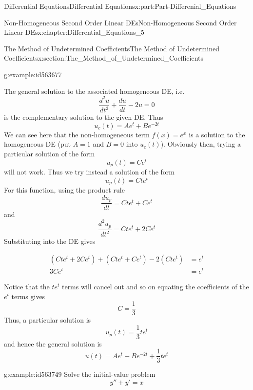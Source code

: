 \documentclass[oneside,10pt,]{book}
\numberwithin{equation}{section}
\newcommand{\amp}{&}
\begin{document}
\begin{partptx}{Differential Equations}{}{Differential Equations}{}{}{x:part:Part-Differenial_Equations}
\begin{chapterptx}{Non-Homogeneous Second Order Linear DEs}{}{Non-Homogeneous Second Order Linear DEs}{}{}{x:chapter:Differential_Equations_5}
\begin{sectionptx}{The Method of Undetermined Coefficients}{}{The Method of Undetermined Coefficients}{}{}{x:section:The_Method_of_Undetermined_Coefficients}
\begin{example}{}{g:example:id563677}
%
\par\smallskip%
\noindent\hypertarget{g:solution:id563725}{}The general solution to the associated homogeneous DE, i.e.%
\begin{equation*}
\frac{d^2u}{dt^2}+\frac{du}{dt}-2u=0
\end{equation*}
is the complementary solution to the given DE. Thus%
\begin{equation*}
u_c(t)=Ae^t+Be^{-2t}
\end{equation*}
We can see here that the non-homogeneous term \(f(x)=e^x\) is a solution to the homogeneous DE (put \(A=1\) and \(B=0\) into \(u_c(t)\)). Obviously then, trying a particular solution of the form%
\begin{equation*}
u_p(t)=Ce^t
\end{equation*}
will not work. Thus we try instead a solution of the form%
\begin{equation*}
u_p(t)=Cte^t
\end{equation*}
For this function, using the product rule%
\begin{equation*}
\frac{du_p}{dt}=Cte^t+Ce^t
\end{equation*}
and%
\begin{equation*}
\frac{d^2u_p}{dt^2}=Cte^t+2Ce^t
\end{equation*}
Substituting into the DE gives%
\par
%
\begin{align*}
(Cte^t+2Ce^t)+(Cte^t+Ce^t)-2(Cte^t) \amp =e^t\\
3Ce^t \amp =e^t
\end{align*}
%
\par
Notice that the \(te^t\) terms will cancel out and so on equating the coefficients of the \(e^t\) terms gives%
\begin{equation*}
C=\frac{1}{3}
\end{equation*}
Thus, a particular solution is%
\begin{equation*}
u_p(t)=\frac{1}{3}te^t
\end{equation*}
and hence the general solution is%
\begin{equation*}
u(t)=Ae^t+Be^{-2t}+\frac{1}{3}te^t
\end{equation*}
%
\end{example}
\begin{example}{}{g:example:id563749}%
Solve the initial-value problem%
\begin{equation*}
y''+y'=x
\end{equation*}
%
\begin{equation*}

\end{equation*}
\end{example}
\end{sectionptx}
\end{chapterptx}
\end{partptx}
\end{document}
